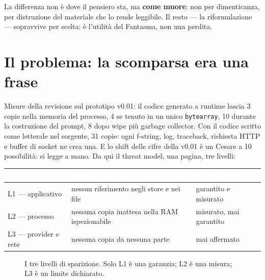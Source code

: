 \documentclass[11pt,a4paper]{article}
\begin{document}
La differenza non \`e dove il pensiero sta, ma \textbf{come muore}: non per dimenticanza,
per distruzione del materiale che lo rende leggibile. Il resto --- la riformulazione ---
sopravvive per scelta: \`e l'utilit\`a del Fantasma, non una perdita.

\section{Il problema: la scomparsa era una frase}
Misure della revisione sul prototipo v0.01: il codice generato a runtime lascia
3 copie nella memoria del processo, 4 se tenuto in un unico \texttt{bytearray},
10 durante la costruzione del prompt, 8 dopo wipe pi\`u garbage collector.
Con il codice scritto come letterale nel sorgente, 31 copie: ogni f-string, log,
traceback, richiesta HTTP e buffer di socket ne crea una. E lo shift delle cifre
della v0.01 \`e un Cesare a 10 possibilit\`a: si legge a mano. Da qui il threat model,
una pagina, tre livelli:

\begin{center}
\begin{tabular}{lll}
\rowcolor{ghostblue}\textcolor{white}{Livello} & \textcolor{white}{Promessa} & \textcolor{white}{Stato v0.02} \\
\midrule
\rowcolor{palegreen}L1 --- applicativo & nessun riferimento negli store e nei file & garantito e misurato \\
\rowcolor{paleamber}L2 --- processo & nessuna copia inattesa nella RAM ispezionabile & misurato, mai garantito \\
\rowcolor{palered}L3 --- provider e rete & nessuna copia da nessuna parte & mai affermato \\
\bottomrule
\end{tabular}
\end{center}

\begin{figure}[h]
\centering
{}
\caption{I tre livelli di sparizione. Solo L1 \`e una garanzia; L2 \`e una misura; L3 \`e un limite dichiarato.}
\end{figure}
\end{document}
